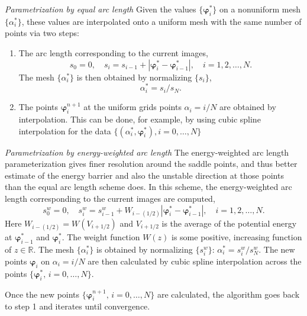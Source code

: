 \emph{Parametrization by equal arc length} Given the values $\{\boldsymbol{\varphi}_i^\ast\}$ on a nonuniform mesh $\{\alpha_i^\ast\}$, these values are interpolated onto a uniform mesh with the same number of points via two steps:
\begin{enumerate}
	\item The arc length corresponding to the current images,
	\begin{equation}
		s_0=0,\quad s_i=s_{i-1}+|\boldsymbol{\varphi}_i^\ast-\boldsymbol{\varphi}_{i-1}^\ast|,\quad i=1,2,\dots,N.
	\end{equation}
	The mesh $\{\alpha_i^\ast\}$ is then obtained by normalizing $\{s_i\}$,
	\begin{equation}
		\alpha_i^\ast=s_i/s_N.
	\end{equation}
	\item The points $\boldsymbol{\varphi}_i^{n+1}$ at the uniform grids points $\alpha_i=i/N$ are obtained by interpolation. This can be done, for example, by using cubic spline interpolation for the data $\{(\alpha_i^\ast,\boldsymbol{\varphi}_i^{\ast}),i=0,\dots,N\}$
\end{enumerate}

\emph{Parametrization by energy-weighted arc length} The energy-weighted arc length parameterization gives finer resolution around the saddle points, and thus better estimate of the energy barrier and also the unstable direction at those points than the equal arc length scheme does. In this scheme, the energy-weighted arc length corresponding to the current images are computed,
\begin{equation}
	s_0^w=0,\quad s_i^w=s_{i-1}^w+W_{i-(1/2)}|\boldsymbol{\varphi}_i^\ast-\boldsymbol{\varphi}_{i-1}^\ast|,\quad i=1,2,\dots,N.
\end{equation}
Here $W_{i-(1/2)}=W(V_{i+1/2})$ and $V_{i+1/2}$ is the average of the potential energy at $\boldsymbol{\varphi}_{i-1}^\ast$ and $\boldsymbol{\varphi}_{i}^\ast$. The weight function $W(z)$ is some positive, increasing function of $z\in \mathbb{R}$. The mesh $\{\alpha_i^\ast\}$ is obtained by normalizing $\{s_i^w\}:\,\alpha_i^\ast=s_i^w/s_N^w$. The new points $\boldsymbol{\varphi}_i$ on $\alpha_i=i/N$ are then calculated by cubic spline interpolation across the points $\{\boldsymbol{\varphi}_i^\ast,\,i=0,\dots,N\}$.

Once the new points $\{\boldsymbol{\varphi}_i^{n+1},\,i=0,\dots,N\}$ are calculated, the algorithm goes back to step 1 and iterates until convergence.

